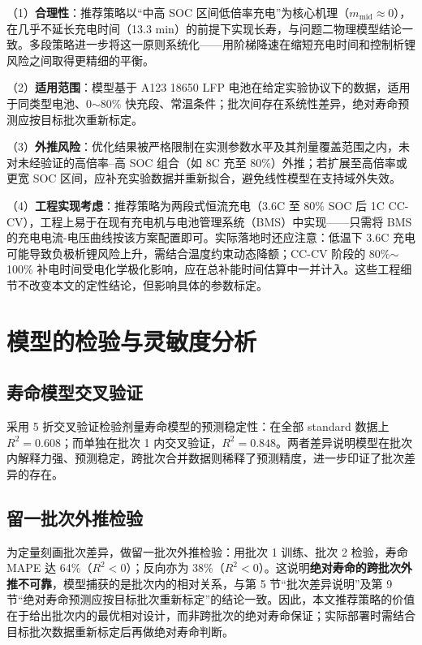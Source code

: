 \documentclass[withoutpreface]{cumcmthesis}
\begin{document}
（1）\textbf{合理性}：推荐策略以``中高 SOC 区间低倍率充电''为核心机理（$m_{\mathrm{mid}}\approx0$），在几乎不延长充电时间（13.3 min）的前提下实现长寿，与问题二物理模型结论一致。多段策略进一步将这一原则系统化——用阶梯降速在缩短充电时间和控制析锂风险之间取得更精细的平衡。

（2）\textbf{适用范围}：模型基于 A123 18650 LFP 电池在给定实验协议下的数据，适用于同类型电池、0$\sim$80\% 快充段、常温条件；批次间存在系统性差异，绝对寿命预测应按目标批次重新标定。

（3）\textbf{外推风险}：优化结果被严格限制在实测参数水平及其剂量覆盖范围之内，未对未经验证的高倍率--高 SOC 组合（如 8C 充至 80\%）外推；若扩展至高倍率或更宽 SOC 区间，应补充实验数据并重新拟合，避免线性模型在支持域外失效。

（4）\textbf{工程实现考虑}：推荐策略为两段式恒流充电（3.6C 至 80\% SOC 后 1C CC-CV），工程上易于在现有充电机与电池管理系统（BMS）中实现——只需将 BMS 的充电电流-电压曲线按该方案配置即可。实际落地时还应注意：低温下 3.6C 充电可能导致负极析锂风险上升，需结合温度约束动态降额；CC-CV 阶段的 80\%$\sim$100\% 补电时间受电化学极化影响，应在总补能时间估算中一并计入。这些工程细节不改变本文的定性结论，但影响具体的参数标定。

\section{模型的检验与灵敏度分析}

\subsection{寿命模型交叉验证}

采用 5 折交叉验证检验剂量寿命模型的预测稳定性：在全部 standard 数据上 $R^2=0.608$；而单独在批次 1 内交叉验证，$R^2=0.848$。两者差异说明模型在批次内解释力强、预测稳定，跨批次合并数据则稀释了预测精度，进一步印证了批次差异的存在。

\subsection{留一批次外推检验}

为定量刻画批次差异，做留一批次外推检验：用批次 1 训练、批次 2 检验，寿命 MAPE 达 64\%（$R^2<0$）；反向亦为 38\%（$R^2<0$）。这说明\textbf{绝对寿命的跨批次外推不可靠}，模型捕获的是批次内的相对关系，与第 5 节“批次差异说明”及第 9 节“绝对寿命预测应按目标批次重新标定”的结论一致。因此，本文推荐策略的价值在于给出批次内的最优相对设计，而非跨批次的绝对寿命保证；实际部署时需结合目标批次数据重新标定后再做绝对寿命判断。
\end{document}
